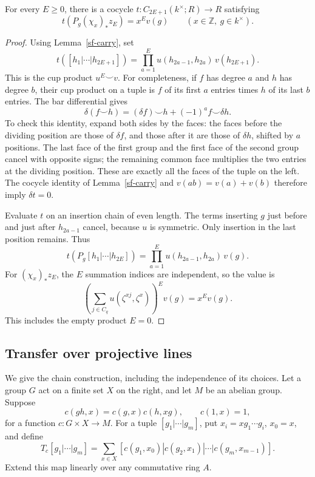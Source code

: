 \begin{proposition}\label{sf-cyclic-functional}
For every \(E\ge0\), there is a cocycle
\(t:C_{2E+1}(k^\times;R)\to R\) satisfying
\[
              t(P_g(\chi_x)_*z_E)=x^E v(g)
            \qquad(x\in\mathbb Z,\ g\in k^\times).
\]
\end{proposition}
\begin{proof}
Using Lemma~\ref{sf-carry}, set
\[
 t([h_1|\cdots|h_{2E+1}])
       =\prod_{a=1}^E u(h_{2a-1},h_{2a})\,
                                      v(h_{2E+1}).
\]
This is the cup product \(u^E\smile v\).
For completeness, if \(f\) has degree \(a\) and
\(h\) has degree \(b\), their cup product on a tuple
is \(f\) of its first \(a\) entries times \(h\) of
its last \(b\) entries.
The bar differential gives
\[
       \delta(f\smile h)
          =(\delta f)\smile h+(-1)^a f\smile\delta h.
\]
To check this identity, expand both sides by the faces:
the faces before the dividing position are those of
\(\delta f\), and those after it are those of
\(\delta h\), shifted by \(a\) positions.
The last face of the first group and the first face
of the second group cancel with opposite signs;
the remaining common face multiplies the two entries
at the dividing position.  These are exactly all
the faces of the tuple on the left.
The cocycle identity of Lemma~\ref{sf-carry} and
\(v(ab)=v(a)+v(b)\) therefore imply \(\delta t=0\).

Evaluate \(t\) on an insertion chain of even length.
The terms inserting \(g\) just before and just after
\(h_{2a-1}\) cancel, because \(u\) is symmetric.
Only insertion in the last position remains.  Thus
\[
 t(P_g[h_1|\cdots|h_{2E}])
       =\prod_{a=1}^E u(h_{2a-1},h_{2a})\,v(g).
\]
For \((\chi_x)_*z_E\), the \(E\) summation indices
are independent, so the value is
\[
       \left(\sum_{j\in C_q}u(\zeta^{xj},\zeta^x)\right)^E
                  v(g)=x^Ev(g).
\]
This includes the empty product \(E=0\).
\end{proof}

\subsection{Transfer over projective lines}

We give the chain construction, including the independence
of its choices.  Let a group \(G\) act on a finite set
\(X\) on the right, and let \(M\) be an abelian group.
Suppose
\[
 c(gh,x)=c(g,x)c(h,xg),\qquad c(1,x)=1,
\]
for a function \(c:G\times X\to M\).
For a tuple \([g_1|\cdots|g_m]\), put
\(x_i=xg_1\cdots g_i\), \(x_0=x\), and define
\[
 T_c[g_1|\cdots|g_m]
    =\sum_{x\in X}
       [c(g_1,x_0)|c(g_2,x_1)|\cdots|c(g_m,x_{m-1})].
\]
Extend this map linearly over any commutative ring \(A\).

